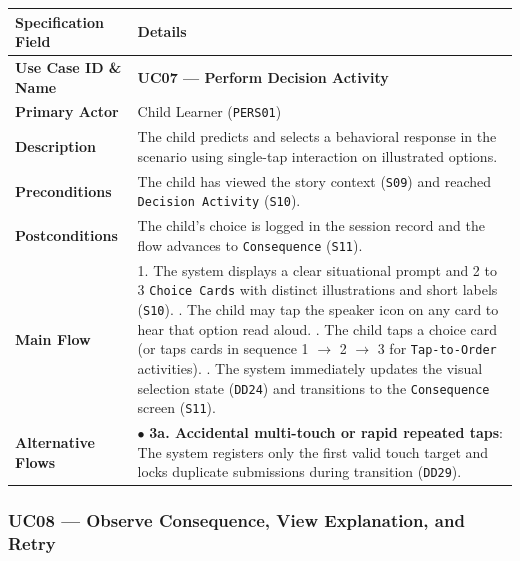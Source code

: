 \noindent\begin{xltabular}{\textwidth}{|p{4.0cm}|X|}
\hline
\textbf{Specification Field} & \textbf{Details} \\ \hline
\endhead
\textbf{Use Case ID \& Name} & \textbf{UC07 — Perform Decision Activity} \\ \hline
\textbf{Primary Actor} & Child Learner (\texttt{PERS01}) \\ \hline
\textbf{Description} & The child predicts and selects a behavioral response in the scenario using single-tap interaction on illustrated options. \\ \hline
\textbf{Preconditions} & The child has viewed the story context (\texttt{S09}) and reached \texttt{Decision Activity} (\texttt{S10}). \\ \hline
\textbf{Postconditions} & The child's choice is logged in the session record and the flow advances to \texttt{Consequence} (\texttt{S11}). \\ \hline
\textbf{Main Flow} & 1. The system displays a clear situational prompt and 2 to 3 \texttt{Choice Cards} with distinct illustrations and short labels (\texttt{S10}). . The child may tap the speaker icon on any card to hear that option read aloud. . The child taps a choice card (or taps cards in sequence 1 $\rightarrow$ 2 $\rightarrow$ 3 for \texttt{Tap-to-Order} activities). . The system immediately updates the visual selection state (\texttt{DD24}) and transitions to the \texttt{Consequence} screen (\texttt{S11}). \\ \hline
\textbf{Alternative Flows} & $\bullet$ \textbf{3a. Accidental multi-touch or rapid repeated taps}: The system registers only the first valid touch target and locks duplicate submissions during transition (\texttt{DD29}). \\ \hline
\end{xltabular}



\subsubsection{UC08 — Observe Consequence, View Explanation, and Retry}


